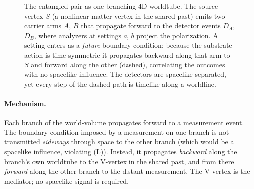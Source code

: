 \begin{figure}[t]
\centering
{}
\caption{The entangled pair as one branching 4D worldtube. The source vertex $S$ (a nonlinear
matter vertex in the shared past) emits two carrier arms $A$, $B$ that propagate forward to the
detector events $D_A$, $D_B$, where analyzers at settings $a$, $b$ project the polarization. A
setting enters as a \emph{future} boundary condition; because the substrate action is
time-symmetric it propagates backward along that arm to $S$ and forward along the other (dashed),
correlating the outcomes with no spacelike influence. The detectors are spacelike-separated, yet
every step of the dashed path is timelike along a worldline.}
\label{fig:worldtube}
\end{figure}

\paragraph{Mechanism.}
Each branch of the world-volume propagates forward to a measurement event.
The boundary condition imposed by a measurement on one branch is not transmitted
\emph{sideways} through space to the other branch (which would be a spacelike influence,
violating (L)).
Instead, it propagates \emph{backward} along the branch's own worldtube to the V-vertex in the
shared past, and from there \emph{forward} along the other branch to the distant measurement.
The V-vertex is the mediator; no spacelike signal is required.

